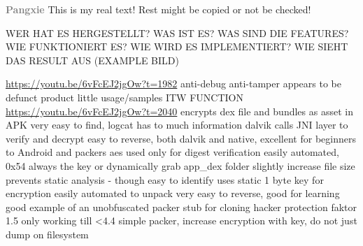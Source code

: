 \newline\newline\textbf{\textcolor{gray}{Pangxie}}\newline
This is my real text! Rest might be copied or not be checked!



WER HAT ES HERGESTELLT? WAS IST ES? WAS SIND DIE FEATURES? WIE FUNKTIONIERT ES? WIE WIRD ES IMPLEMENTIERT? WIE SIEHT DAS RESULT AUS (EXAMPLE BILD)\newline

\url{https://youtu.be/6vFcEJ2jgOw?t=1982}\newline
anti-debug\newline
anti-tamper\newline
appears to be defunct product\newline
little usage/samples ITW\newline
FUNCTION\newline
\url{https://youtu.be/6vFcEJ2jgOw?t=2040}\newline
encrypts dex file and bundles as asset in APK\newline
very easy to find, logcat has to much information\newline
dalvik calls JNI layer to verify and decrypt\newline
easy to reverse, both dalvik and native, excellent for beginners to Android and packers\newline
aes used only for digest verification\newline
easily automated, 0x54 always the key\newline
or dynamically grab app\_dex folder\newline
slightly increase file size\newline
prevents static analysis - though easy to identify\newline
uses static 1 byte key for encryption\newline
easily automated to unpack\newline
very easy to reverse, good for learning\newline
good example of an unobfuscated packer stub for cloning\newline
hacker protection faktor 1.5\newline
only working till <4.4\newline
simple packer, increase encryption with key, do not just dump on filesystem
